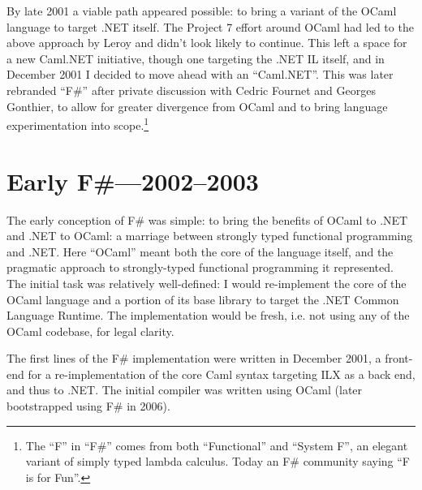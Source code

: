 \documentclass[acmsmall]{acmart}\settopmatter{}
\begin{document}
By late 2001 a viable path appeared possible: to bring a variant of the OCaml language to target .NET itself. The Project 7 effort around OCaml had led to the above approach by Leroy and didn’t look likely to continue.  This left a space for a new Caml.NET initiative, though one targeting the .NET IL itself, and in December 2001 I decided to move ahead with an “Caml.NET”. This was later rebranded “F\#” after private discussion with Cedric Fournet and Georges Gonthier, to allow for greater divergence from OCaml and to bring language experimentation into scope.\footnote{The “F” in “F\#” comes from both “Functional” and “System F”, an elegant variant of simply typed lambda calculus. Today an F\# community saying “F is for Fun”.}


\section*{Early F\#---2002--2003}

The early conception of F\# was simple: to bring the benefits of OCaml to .NET and .NET to OCaml: a marriage between strongly typed functional programming and .NET.  Here “OCaml” meant both the core of the language itself, and the pragmatic approach to strongly-typed functional programming it represented. The initial task was relatively well-defined: I would re-implement the core of the OCaml language and a portion of its base library to target the .NET Common Language Runtime. The implementation would be fresh, i.e. not using any of the OCaml codebase, for legal clarity. 

The first lines of the F\# implementation were written in December 2001, a front-end for a re-implementation of the core Caml syntax targeting ILX as a back end, and thus to .NET. The initial compiler was written using OCaml (later bootstrapped using F\# in 2006). 
\end{document}
